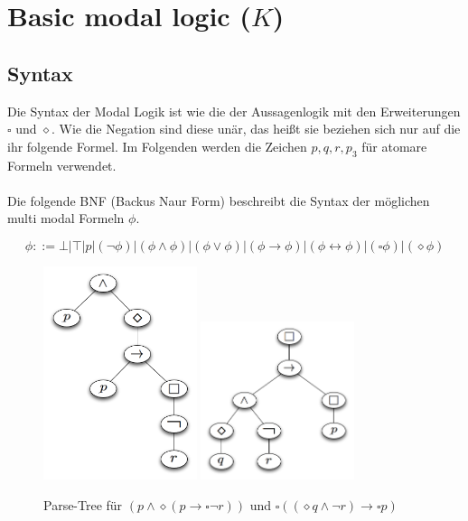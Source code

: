

\section{Basic modal logic ($K$)} %
\label{sec:basic_modal_logic}

\subsection{Syntax} %
\label{sec:syntax}
Die Syntax der Modal Logik ist wie die der Aussagenlogik mit den Erweiterungen $\square$ und $\diamond$. 
Wie die Negation sind diese unär, das heißt sie beziehen sich nur auf die ihr folgende Formel. Im Folgenden werden die Zeichen $p, q, r, p_3$ für atomare Formeln verwendet.\cite[S.307f]{huth2004logic}\\
\\
Die folgende BNF (Backus Naur Form) beschreibt die Syntax der möglichen multi modal Formeln $\phi$.

\begin{equation}
	\phi ::= \bot|\top|p|(\neg\phi)|(\phi\wedge\phi)|(\phi\vee\phi)|(\phi\rightarrow\phi)|
	(\phi\leftrightarrow\phi)|(\square\phi)|(\diamond\phi)
\end{equation}

\begin{figure}[ht]
	\begin{center}
  	\includegraphics[width=0.4\textwidth]{./Images/mmFormel01.png}
		\includegraphics[width=0.4\textwidth]{./Images/mmFormel02.png}
  	\caption{Parse-Tree für $(p \wedge \diamond(p \rightarrow \square \neg r))$ und 
		$\square((\diamond q \wedge \neg r) \rightarrow \square p )$}
		\label{fig:mmFormel01}
	\end{center}
\end{figure}


